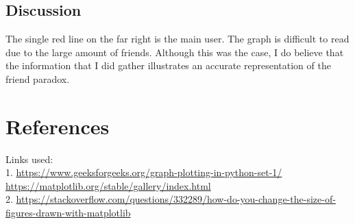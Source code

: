 \documentclass[12pt]{article}
\begin{document}
\subsection*{Discussion}
The single red line on the far right is the main user. The graph is difficult to read due to the large amount of friends. Although this was the case, I do believe that the information that I did gather illustrates an accurate representation of the friend paradox.

\section*{References}
Links used: \\
1. \url{https://www.geeksforgeeks.org/graph-plotting-in-python-set-1/ https://matplotlib.org/stable/gallery/index.html}  \\
2.  \url{https://stackoverflow.com/questions/332289/how-do-you-change-the-size-of-figures-drawn-with-matplotlib}  \\
\end{document}
